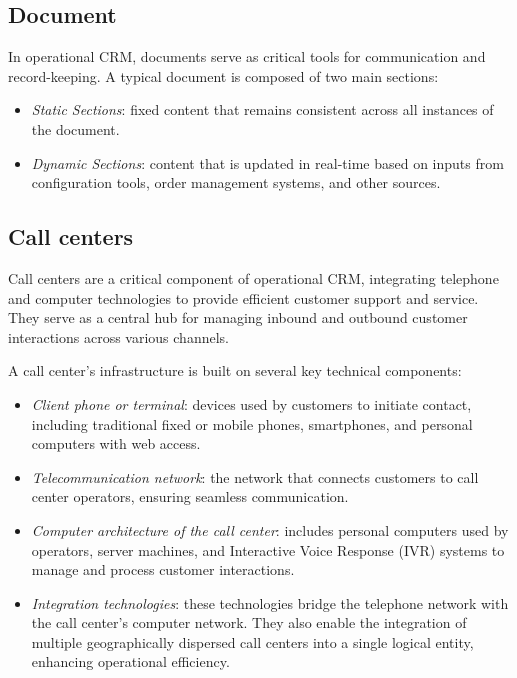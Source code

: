 \subsection{Document}
In operational CRM, documents serve as critical tools for communication and record-keeping. 
A typical document is composed of two main sections:
\begin{itemize}
    \item \textit{Static Sections}: fixed content that remains consistent across all instances of the document.
    \item \textit{Dynamic Sections}: content that is updated in real-time based on inputs from configuration tools, order management systems, and other sources.
\end{itemize}




\subsection{Call centers}
Call centers are a critical component of operational CRM, integrating telephone and computer technologies to provide efficient customer support and service. 
They serve as a central hub for managing inbound and outbound customer interactions across various channels.

A call center's infrastructure is built on several key technical components:
\begin{itemize}
    \item \textit{Client phone or terminal}: devices used by customers to initiate contact, including traditional fixed or mobile phones, smartphones, and personal computers with web access.
    \item \textit{Telecommunication network}: the network that connects customers to call center operators, ensuring seamless communication.
    \item \textit{Computer architecture of the call center}: includes personal computers used by operators, server machines, and Interactive Voice Response (IVR) systems to manage and process customer interactions.
    \item \textit{Integration technologies}: these technologies bridge the telephone network with the call center's computer network. 
        They also enable the integration of multiple geographically dispersed call centers into a single logical entity, enhancing operational efficiency.
\end{itemize}

